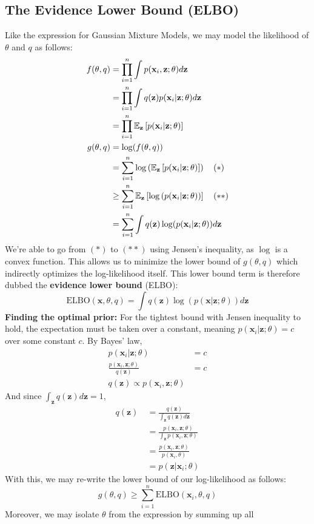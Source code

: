 \subsection{The Evidence Lower Bound (ELBO)}
Like the expression for Gaussian Mixture Models, we may model the likelihood of $\theta$ and $q$ as follows:
\begin{align*}
        f(\theta,q) 
        &= \prod_{i=1}^n \int p(\mathbf{x}_i,\mathbf{z};\theta)d\mathbf{z}\\
        &= \prod_{i=1}^n \int q(\mathbf{z}) p(\mathbf{x}_i|\mathbf{z};\theta)d\mathbf{z}\\
        &= \prod_{i=1}^n \mathbb{E}_\mathbf{z}\left[p(\mathbf{x}_i|\mathbf{z};\theta)\right]\\
        g(\theta,q) 
        &= \log(f(\theta,q)) \\
        &= \sum_{i=1}^n \log\left(\mathbb{E}_\mathbf{z}\left[p(\mathbf{x}_i|\mathbf{z};\theta)\right]\right) \quad (*) \\
        &\ge \sum_{i=1}^n \mathbb{E}_\mathbf{z}\left[\log\left(p(\mathbf{x}_i|\mathbf{z};\theta)\right)\right] \quad (**) \\
        &= \sum_{i=1}^n \int q(\mathbf{z}) \log(p(\mathbf{x}_i|\mathbf{z};\theta)) d\mathbf{z}
\end{align*}
We're able to go from $(*)$ to $(**)$ using Jensen's inequality, as $\log$ is a convex function. This allows us to minimize the lower bound of $g(\theta,q)$ which indirectly optimizes the log-likelihood itself. This lower bound term is therefore dubbed the \textbf{evidence lower bound} (ELBO):
\[
\text{ELBO}(\mathbf{x},\theta,q) = \int q(\mathbf{z}) \log(p(\mathbf{x}|\mathbf{z};\theta)) d\mathbf{z}
\]
\textbf{Finding the optimal prior:} For the tightest bound with Jensen inequality to hold, the expectation must be taken over a constant, meaning $p(\mathbf{x}_i|\mathbf{z};\theta)=c$ over some constant $c$. By Bayes' law,
\begin{align*}
    p(\mathbf{x}_i|\mathbf{z};\theta)&=c\\
    \frac{p(\mathbf{x}_i,\mathbf{z};\theta)}{q(\mathbf{z})}&=c\\
    q(\mathbf{z}) \propto p(\mathbf{x}_i,\mathbf{z};\theta)
\end{align*}
And since $\int_{\mathbf{z}} q(\mathbf{z}) d\mathbf{z}=1$,
\begin{align*}
    q(\mathbf{z}) \
    &= \frac{q(\mathbf{z})}{\int_{\mathbf{z}} q(\mathbf{z}) d\mathbf{z}} \\
    &= \frac{p(\mathbf{x}_i,\mathbf{z};\theta)}{\int_{\mathbf{z}} p(\mathbf{x}_i,\mathbf{z};\theta)} \\
    &= \frac{p(\mathbf{x}_i,\mathbf{z};\theta)}{p(\mathbf{x}_i,\theta)} \\
    &= p(\mathbf{z}|\mathbf{x}_i;\theta)
\end{align*}
With this, we may re-write the lower bound of our log-likelihood as follows:
\[
    g(\theta,q) \ge \sum_{i=1}^n \text{ELBO}(\mathbf{x}_i,\theta,q)
\]
Moreover, we may isolate $\theta$ from the expression by summing up all 
